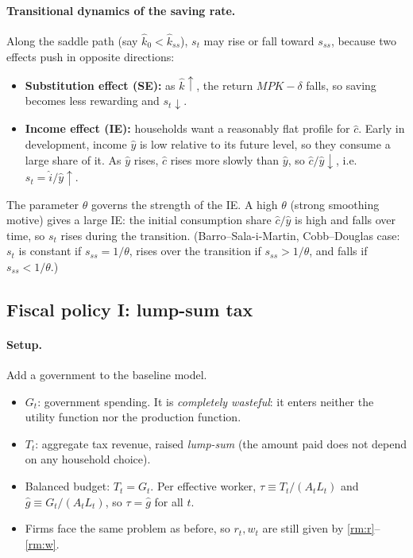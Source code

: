 \paragraph{Transitional dynamics of the saving rate.} Along the saddle path (say $\hat k_0<\hat k_{ss}$), $s_t$ may rise or fall toward $s_{ss}$, because two effects push in opposite directions:
\begin{itemize}
\item \textbf{Substitution effect (SE):} as $\hat k\uparrow$, the return $MPK-\delta$ falls, so saving becomes less rewarding and $s_t\downarrow$.
\item \textbf{Income effect (IE):} households want a reasonably flat profile for $\hat c$. Early in development, income $\hat y$ is low relative to its future level, so they consume a large share of it. As $\hat y$ rises, $\hat c$ rises more slowly than $\hat y$, so $\hat c/\hat y\downarrow$, i.e.\ $s_t=\hat i/\hat y\uparrow$.
\end{itemize}
The parameter $\theta$ governs the strength of the IE. A high $\theta$ (strong smoothing motive) gives a large IE: the initial consumption share $\hat c/\hat y$ is high and falls over time, so $s_t$ rises during the transition. (Barro--Sala-i-Martin, Cobb--Douglas case: $s_t$ is constant if $s_{ss}=1/\theta$, rises over the transition if $s_{ss}>1/\theta$, and falls if $s_{ss}<1/\theta$.)

\subsection{Fiscal policy I: lump-sum tax }

\paragraph{Setup.} Add a government to the baseline model.
\begin{itemize}
\item $G_t$: government spending. It is \emph{completely wasteful}: it enters neither the utility function nor the production function.
\item $T_t$: aggregate tax revenue, raised \emph{lump-sum} (the amount paid does not depend on any household choice).
\item Balanced budget: $T_t=G_t$. Per effective worker, $\tau\equiv T_t/(A_tL_t)$ and $\hat g\equiv G_t/(A_tL_t)$, so $\tau=\hat g$ for all $t$.
\item Firms face the same problem as before, so $r_t,w_t$ are still given by \eqref{rm:r}--\eqref{rm:w}.
\end{itemize}

